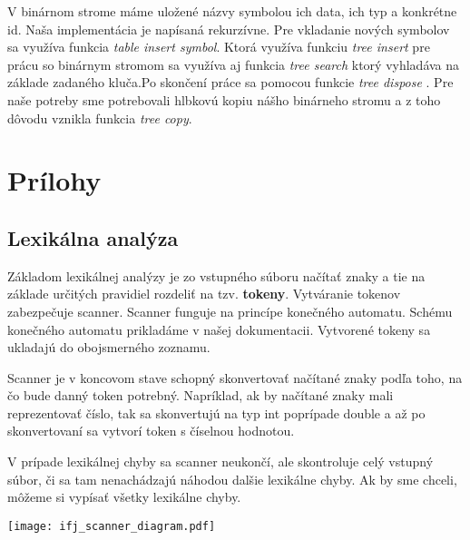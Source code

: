 \documentclass[12pt, a4paper]{article}
\begin{document}
				V binárnom strome máme uložené názvy symbolou ich data, ich typ a konkrétne id. Naša implementácia je napísaná rekurzívne. Pre vkladanie nových symbolov sa využíva funkcia \textit{table insert symbol}. Ktorá využíva funkciu \textit{tree insert} pre prácu so binárnym stromom sa využíva aj funkcia \textit{tree search} ktorý vyhladáva na základe zadaného kluča.Po skončení práce sa pomocou funkcie \textit{tree dispose} . Pre naše potreby sme potrebovali hlbkovú kopiu nášho binárneho stromu a z toho dôvodu vznikla funkcia \textit{tree copy}.
	\section{Prílohy}
        \subsection{Lexikálna analýza} \label{sec:KA}
        Základom lexikálnej analýzy je zo vstupného súboru načítať znaky a tie na základe určitých pravidiel rozdeliť na tzv. \textbf{tokeny}. Vytváranie tokenov zabezpečuje scanner. Scanner funguje na princípe konečného automatu. Schému konečného automatu prikladáme v našej dokumentacii. Vytvorené tokeny sa ukladajú do obojsmerného zoznamu. 
        
        Scanner je v koncovom stave schopný skonvertovať načítané znaky podľa toho, na čo bude danný token potrebný. Napríklad, ak by načítané znaky mali reprezentovať číslo, tak sa skonvertujú na typ int poprípade double a až po skonvertovaní sa vytvorí token s číselnou hodnotou.
        
        V prípade lexikálnej chyby sa scanner neukončí, ale skontroluje celý vstupný súbor, či sa tam nenachádzajú náhodou dalšie lexikálne chyby. Ak by sme chceli, môžeme si vypísať všetky lexikálne chyby.

	    \begin{center}
	    	\texttt{[image: ifj\_scanner\_diagram.pdf]}
	    \end{center}
\end{document}
